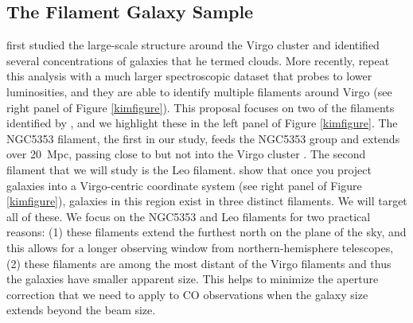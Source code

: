 \documentclass[11pt, preprint]{aastex}
\begin{document}
\vspace*{-1cm}\subsection{The Filament Galaxy Sample} 
\vspace*{-.4cm}
\citet{tully82} first studied the large-scale structure around the Virgo
cluster and identified several concentrations of galaxies that he
termed clouds.  More recently, \citet{kim16} repeat this analysis with
a much larger spectroscopic dataset that probes to lower luminosities,
and they are able to identify multiple
filaments around Virgo (see right panel of Figure \ref{kimfigure}).
This proposal focuses on two of the filaments identified by
\citet{kim16}, and we highlight these in the left panel of Figure
\ref{kimfigure}.  The NGC5353 filament, the first in our study, feeds the NGC5353 group and extends over 20~Mpc,
passing close to but not into the Virgo cluster \citep{kim16}.  The second filament
that we will study is the Leo filament.  \citet{kim16} show that once
you project galaxies into a Virgo-centric coordinate system (see right
panel of Figure \ref{kimfigure}), galaxies
in this region exist in three distinct filaments.  We will target all
of these.  We focus on
the NGC5353 and Leo filaments for two practical reasons:  (1) these filaments
extend the furthest north on the plane of the sky, and this allows
for a longer observing window from northern-hemisphere telescopes, (2)
these filaments are among the most distant of the Virgo filaments and
thus the galaxies have smaller apparent size.  This helps to minimize
the aperture correction that we need to apply to CO observations when the galaxy size extends beyond the beam size.  
\end{document}

